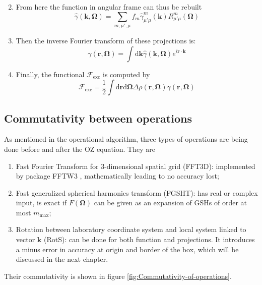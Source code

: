 \begin{enumerate}
\begin{equation}
\end{equation}
\item From here the function in angular frame can thus be rebuilt
\begin{equation}
\hat{\gamma}(\mathbf{k},\mathbf{\Omega})=\sum_{m,\mu',\mu}f_{m}\hat{\gamma}_{\mu'\mu}^{m}(\mathbf{k})R_{\mu'\mu}^{m}(\mathbf{\Omega})\label{eq:fgsht-bwd}
\end{equation}
\item Then the inverse Fourier transform of these projections is:
\begin{equation}
\gamma(\mathbf{r},\mathbf{\Omega})=\int\mathrm{d}\mathbf{k}\hat{\gamma}(\mathbf{k},\mathbf{\Omega})e^{i\mathbf{r}\cdot\mathbf{k}}
\end{equation}
\item Finally, the functional $\mathcal{F}_{\mathrm{exc}}$ is computed
by
\begin{equation}
\mathcal{F}_{\mathrm{exc}}=\frac{1}{2}\int\mathrm{d}\mathbf{r}\mathrm{d}\mathbf{\Omega}\Delta\rho(\mathbf{r},\mathbf{\Omega})\gamma(\mathbf{r},\mathbf{\Omega})
\end{equation}
\end{enumerate}

\subsection{Commutativity between operations\label{subsec:Commutativity-between-operations}}

As mentioned in the operational algorithm, three types of operations
are being done before and after the \acs{OZ} equation. They are
\begin{enumerate}
\item Fast Fourier Transform for 3-dimensional spatial grid (FFT3D): implemented
by package FFTW3 \citep{FFTW3}, mathematically leading to no accuracy
lost;
\item Fast generalized spherical harmonics transform (\acs{FGSHT}): has
real or complex input, is exact if $F(\mathbf{\Omega})$ can be given
as an expansion of \acs{GSH}s of order at most $m_{\mathrm{max}}$;
\item Rotation between laboratory coordinate system and local system linked
to vector $\mathbf{k}$ (RotS): can be done for both function and
projections. It introduces a minus error in accuracy at origin and
border of the box, which will be discussed in the next chapter.
\end{enumerate}
Their commutativity is shown in figure \ref{fig:Commutativity-of-operations}.

